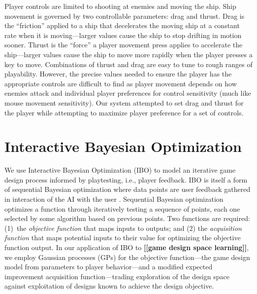 \documentclass[letterpaper]{article}
\newcommand{\mytodo}[1]{\textbf{[[#1]]}}
\begin{document}
Player controls are limited to shooting at enemies and moving the ship. 
Ship movement is governed by two controllable parameters: drag and thrust. Drag is the ``friction'' applied to a ship that decelerates the moving ship at a constant rate when it is moving---larger values cause the ship to stop drifting in motion sooner. Thrust is the ``force'' a player movement press applies to accelerate the ship---larger values cause the ship to move more rapidly when the player presses a key to move. 
%
Combinations of thrust and drag are easy to tune to rough ranges of playability. However, the precise values needed to ensure the player has the appropriate controls are difficult to find as player movement depends on how enemies attack and individual player preferences for control sensitivity (much like mouse movement sensitivity). 
Our system attempted to set drag and thrust for the player while attempting to maximize player preference for a set of controls.



\section{Interactive Bayesian Optimization}

We use Interactive Bayesian Optimization (IBO) to model an iterative game design process informed by playtesting, i.e., player feedback. IBO is itself a form of sequential Bayesian optimization where data points are user feedback gathered in interaction of the AI with the user \cite{brochu2010:thesis}.
Sequential Bayesian optimization optimizes a function through iteratively testing a sequence of points, each one selected by some algorithm based on previous points. 
Two functions are required: (1)~the \textit{objective function} that maps inputs to outputs; and (2) the \textit{acquisition function} that maps potential inputs to their value for optimizing the objective function output. 
%
In our application of IBO to \mytodo{game design space learning}, we employ Gaussian processes (GPs) for the objective function---the game design model from parameters to player behavior---and a modified expected improvement acquisition function---trading exploration of the design space against exploitation of designs known to achieve the design objective.
\end{document}
